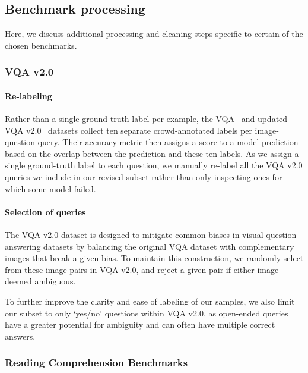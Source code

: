 \subsection{Benchmark processing} \label{app:benchmarks}
Here, we discuss additional processing and cleaning steps specific to certain of the chosen benchmarks.

\subsubsection{VQA v2.0} \label{app:vqa}

\paragraph{Re-labeling} Rather than a single ground truth label per example, the VQA~\cite{antol2015vqa} and updated VQA v2.0~\citep{goyal2017making} datasets collect ten separate crowd-annotated labels per image-question query. Their accuracy metric then assigns a score to a model prediction based on the overlap between the prediction and these ten labels. As we assign a single ground-truth label to each question, we manually re-label all the VQA v2.0 queries we include in our revised subset rather than only inspecting ones for which some model failed.

\paragraph{Selection of queries} The VQA v2.0 dataset is designed to mitigate common biases in visual question answering datasets by balancing the original VQA dataset with complementary images that break a given bias. To maintain this construction, we randomly select from these image pairs in VQA v2.0, and reject a given pair if either image deemed ambiguous.

To further improve the clarity and ease of labeling of our samples, we also limit our subset to only `yes/no' questions within VQA v2.0, as open-ended queries have a greater potential for ambiguity and can often have multiple correct answers.

\subsubsection{Reading Comprehension Benchmarks} \label{app:hotpotqa}
